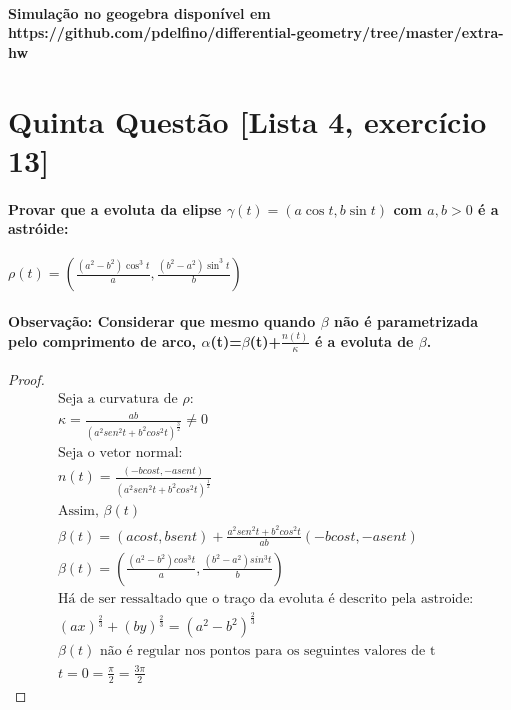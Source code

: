 \documentclass[fleqn]{article}
\begin{document}
\paragraph{Simulação no geogebra disponível em https://github.com/pdelfino/differential-geometry/tree/master/extra-hw}

\newpage

\section*{Quinta Questão [Lista 4, exercício 13]} 

\paragraph{Provar que a evoluta da elipse $\gamma (t)  = (a \cos t, b \sin t)$  com $ a, b > 0 $ é a astróide:}

$\rho (t) = (\frac{(a^2-b^2) \cos ^3 t}{a},\frac{(b^2-a^2) \sin ^3 t}{b} )$ 

\paragraph{Observação: Considerar que mesmo quando $\beta$ não é parametrizada pelo comprimento de arco, $\alpha$(t)=$\beta$(t)+$\frac{n(t)}{\kappa}$ é a evoluta de $\beta$.}

\begin{proof}
\begin{align*}
&\text{Seja a curvatura de $\rho$:} \\
&\kappa=\frac{ab}{(a^2sen ^2 t+b^2cos ^2 t)^{\frac{3}{2}}}\neq 0 \\
&\text{Seja o vetor normal:} \\ 
&n(t)=\frac{(-bcos t,-asen t)}{(a^2sen^2 t+b^2cos^2 t)^{\frac{1}{2}}} \\
&\text{Assim, } \beta(t)  \\
&\beta(t)=(acos t, bsen t)+\frac{a^2sen^2 t+b^2cos^2 t}{ab}(-bcos t,-asen t) \\
&\beta(t)= (\frac{(a^2-b^2)cos^3 t}{a},\frac{(b^2-a^2)sin^3 t}{b} ) \\
&\text{Há de ser ressaltado que o traço da evoluta é descrito pela astroide:} \\
&(ax)^\frac{2}{3}+(by)^\frac{2}{3}=(a^2-b^2)^\frac{2}{3} \\
&\beta(t) \text{ não é regular nos pontos para os seguintes valores de t} \\
&t=0=\frac{\pi}{2}=\frac{3\pi}{2}
\end{align*}
\end{proof}
\end{document}
